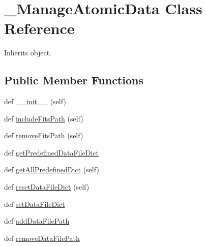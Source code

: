 \hypertarget{classpyneb_1_1utils_1_1manage__atomic__data_1_1___manage_atomic_data}{}\section{\+\_\+\+Manage\+Atomic\+Data Class Reference}
\label{classpyneb_1_1utils_1_1manage__atomic__data_1_1___manage_atomic_data}


Inherits object.

\subsection*{Public Member Functions}
\begin{DoxyCompactItemize}
\item 
def \hyperlink{classpyneb_1_1utils_1_1manage__atomic__data_1_1___manage_atomic_data_ae64f0875afe3067b97ba370b354b9213}{\+\_\+\+\_\+init\+\_\+\+\_\+} (self)
\item 
def \hyperlink{classpyneb_1_1utils_1_1manage__atomic__data_1_1___manage_atomic_data_a7c3cb786ce8227eddf2950f269653aec}{include\+Fits\+Path} (self)
\item 
def \hyperlink{classpyneb_1_1utils_1_1manage__atomic__data_1_1___manage_atomic_data_a4002afac97c99868187a7023af4da478}{remove\+Fits\+Path} (self)
\item 
def \hyperlink{classpyneb_1_1utils_1_1manage__atomic__data_1_1___manage_atomic_data_a6c91ed7c30a4cd3ff5f5a92bacb4fe62}{get\+Predefined\+Data\+File\+Dict}
\item 
def \hyperlink{classpyneb_1_1utils_1_1manage__atomic__data_1_1___manage_atomic_data_af792e70763dbda0fa6a1d34414ea910d}{get\+All\+Predefined\+Dict} (self)
\item 
def \hyperlink{classpyneb_1_1utils_1_1manage__atomic__data_1_1___manage_atomic_data_ac502ce2d5f046e6b7d56e44029fa6ade}{reset\+Data\+File\+Dict} (self)
\item 
def \hyperlink{classpyneb_1_1utils_1_1manage__atomic__data_1_1___manage_atomic_data_ab4c2e82049bd88582e31e53028cd8f76}{set\+Data\+File\+Dict}
\item 
def \hyperlink{classpyneb_1_1utils_1_1manage__atomic__data_1_1___manage_atomic_data_aa3c20cfbde4bd16d8b2e28feeafd4a0e}{add\+Data\+File\+Path}
\item 
def \hyperlink{classpyneb_1_1utils_1_1manage__atomic__data_1_1___manage_atomic_data_a302db5fb2db9a6aec05b81ddbf1646d9}{remove\+Data\+File\+Path}
\item 

\end{DoxyCompactItemize}
